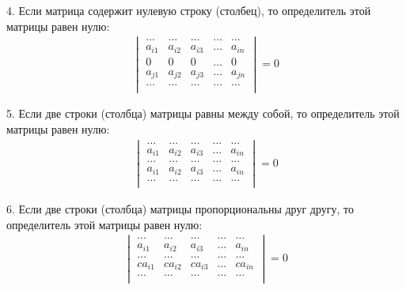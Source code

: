 \documentclass[a4paper,12pt]{extbook}
\theoremstyle{numbered}
\theoremstyle{named}
\theoremstyle{named}
\theoremstyle{named}
\begin{document}
4. Если матрица содержит нулевую строку (столбец), то определитель этой матрицы равен нулю:
\begin{gather*}
    \begin{vmatrix}
        \dots  & \dots  & \dots  & \dots & \dots  \\
        a_{i1} & a_{i2} & a_{i3} & \dots & a_{in} \\
        0      & 0      & 0      & \dots & 0      \\
        a_{j1} & a_{j2} & a_{j3} & \dots & a_{jn} \\
        \dots  & \dots  & \dots  & \dots & \dots  \\
    \end{vmatrix}
    = 0
\end{gather*}

5. Если две строки (столбца) матрицы равны между собой, то определитель этой матрицы равен нулю:
\begin{gather*}
    \begin{vmatrix}
        \dots  & \dots  & \dots  & \dots & \dots  \\
        a_{i1} & a_{i2} & a_{i3} & \dots & a_{in} \\
        \dots  & \dots  & \dots  & \dots & \dots  \\
        a_{i1} & a_{i2} & a_{i3} & \dots & a_{in} \\
        \dots  & \dots  & \dots  & \dots & \dots  \\
    \end{vmatrix}
    = 0
\end{gather*}

6. Если две строки (столбца) матрицы пропорциональны друг другу, то определитель этой матрицы равен нулю:
\begin{gather*}
    \begin{vmatrix}
        \dots   & \dots   & \dots   & \dots & \dots   \\
        a_{i1}  & a_{i2}  & a_{i3}  & \dots & a_{in}  \\
        \dots   & \dots   & \dots   & \dots & \dots   \\
        ca_{i1} & ca_{i2} & ca_{i3} & \dots & ca_{in} \\
        \dots   & \dots   & \dots   & \dots & \dots   \\
    \end{vmatrix}
    = 0
\end{gather*}
\end{document}

